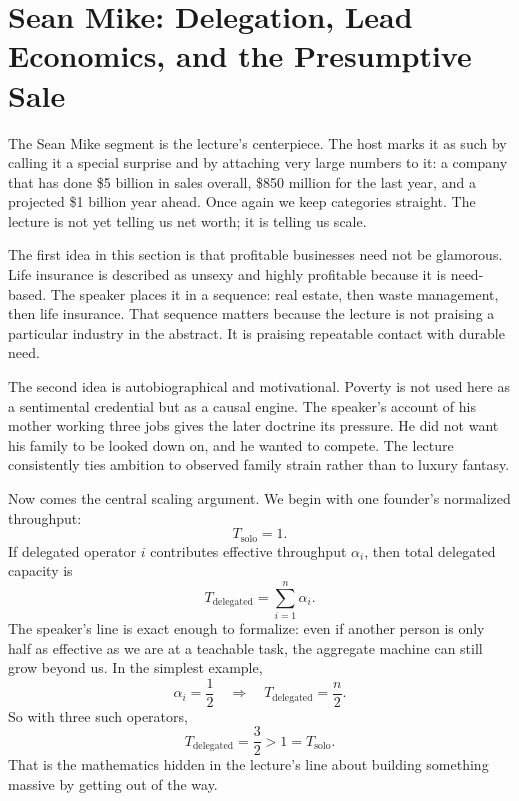 \section{Sean Mike: Delegation, Lead Economics, and the Presumptive Sale}

The Sean Mike segment is the lecture's centerpiece. The host marks it as such by calling it a special surprise and by attaching very large numbers to it: a company that has done \$5 billion in sales overall, \$850 million for the last year, and a projected \$1 billion year ahead. Once again we keep categories straight. The lecture is not yet telling us net worth; it is telling us scale.

The first idea in this section is that profitable businesses need not be glamorous. Life insurance is described as unsexy and highly profitable because it is need-based. The speaker places it in a sequence: real estate, then waste management, then life insurance. That sequence matters because the lecture is not praising a particular industry in the abstract. It is praising repeatable contact with durable need.

The second idea is autobiographical and motivational. Poverty is not used here as a sentimental credential but as a causal engine. The speaker's account of his mother working three jobs gives the later doctrine its pressure. He did not want his family to be looked down on, and he wanted to compete. The lecture consistently ties ambition to observed family strain rather than to luxury fantasy.

Now comes the central scaling argument. We begin with one founder's normalized throughput:
\[
T_{\mathrm{solo}}=1.
\]
If delegated operator \(i\) contributes effective throughput \(\alpha_i\), then total delegated capacity is
\begin{equation}
T_{\mathrm{delegated}}=\sum_{i=1}^{n}\alpha_i.
\end{equation}
The speaker's line is exact enough to formalize: even if another person is only half as effective as we are at a teachable task, the aggregate machine can still grow beyond us. In the simplest example,
\begin{equation}
\alpha_i=\frac{1}{2}\quad\Longrightarrow\quad T_{\mathrm{delegated}}=\frac{n}{2}.
\end{equation}
So with three such operators,
\[
T_{\mathrm{delegated}}=\frac{3}{2}>1=T_{\mathrm{solo}}.
\]
That is the mathematics hidden in the lecture's line about building something massive by getting out of the way.

